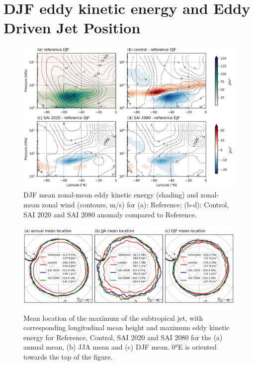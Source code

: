 \section{DJF eddy kinetic energy and Eddy Driven Jet Position}\label{app_EDJ}
\begin{figure}[H]
	\centering
	\includegraphics[width=0.95\linewidth]{images/EKE_U_zmdiff_DJF.png}
	\caption{DJF mean zonal-mean eddy kinetic energy (shading) and zonal-mean zonal wind (contours, m/s) for (a): Reference; (b-d): Control, SAI 2020 and SAI 2080 anomaly compared to Reference.}
	\label{fig:EKE_U_zmdiff_DJF}
\end{figure}

\begin{figure}[H]
	\centering
	\includegraphics[width=0.95\linewidth]{images/EDJ_maxloc.png}
	\caption{Mean location of the maximum of the subtropical jet, with corresponding longitudinal mean height and maximum eddy kinetic energy for Reference, Control, SAI 2020 and SAI 2080 for the (a) annual mean, (b) JJA mean and (c) DJF mean. 0°E is oriented towards the top of the figure.}
	\label{fig:EDJ_maxloc}
\end{figure}